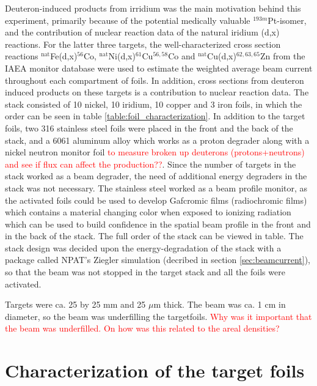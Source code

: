 \noindent 
Deuteron-induced products from irridium was the main motivation behind this experiment, primarily because of the potential medically valuable $^{193m}$Pt-isomer, and the contribution of nuclear reaction data of the natural iridium (d,x) reactions. For the latter three targets, the well-characterized cross section reactions $^\text{nat}$Fe(d,x)$^{56}$Co, $^\text{nat}$Ni(d,x)$^{61}$Cu$^{56,58}$Co and $^\text{nat}$Cu(d,x)$^{62,63,65}$Zn from the IAEA monitor database\cite{Hermanne2018a} were used to estimate the weighted average beam current throughout each compartment of foils. In addition, cross sections from deuteron induced products on these targets is a contribution to nuclear reaction data. The stack consisted of 10 nickel, 10 iridium, 10 copper and 3 iron foils, in which the order can be seen in table \ref{table:foil_characterization}. In addition to the target foils, two 316 stainless steel foils were placed in the front and the back of the stack, and a 6061 aluminum alloy which works as a proton degrader along with a nickel neutron monitor foil \textcolor{red}{to measure broken up deuterons (protons+neutrons) and see if flux can affect the production??}. Since the number of targets in the stack worked as a beam degrader, the need of additional energy degraders in the stack was not necessary. The stainless steel worked as a beam profile monitor, as the activated foils could be used to develop Gafcromic films (radiochromic films) which contains a material changing color when exposed to ionizing radiation which can be used to build confidence in the spatial beam profile in the front and in the back of the stack. The full order of the stack can be viewed in table. The stack design was decided upon the energy-degradation  of the stack with a package called NPAT's Ziegler simulation \cite{MorellJ} (decribed in section \ref{sec:beamcurrent}), so that the beam was not stopped in the target stack and all the foils were activated.  
 
Targets were ca. 25 by 25 mm and 25 $\mu$m thick. The beam was ca. 1 cm in diameter, so the beam was underfilling the targetfoils. \textcolor{red}{Why was it important that the beam was underfilled. On how was this related to the areal densities?} 

\section{Characterization of the target foils} \label{subsec:target_design}


